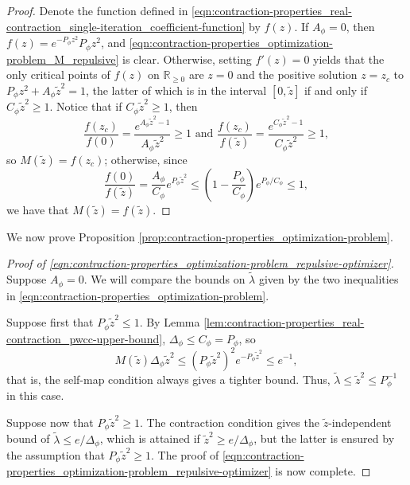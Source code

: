 \documentclass[11pt]{article}
\newcommand{\R}{\mathbb R}
\newcommand{\pwcc}{\Delta_{\phi}}
\newcommand{\tl}{\tilde{\lambda}}
\newcommand{\tz}{\tilde{z}}
\newcommand{\aconst}{A_{\phi}}
\newcommand{\pconst}{P_{\phi}}
\numberwithin{equation}{section}
\theoremstyle{plain}
\theoremstyle{definition}
\theoremstyle{remark}
\begin{document}
\begin{proof}
Denote the function defined in \eqref{eqn:contraction-properties_real-contraction_single-iteration_coefficient-function} by $f(z)$.
If $\aconst=0$, then $f(z)=e^{-\pconst z^{2}}\pconst z^{2}$, and \eqref{eqn:contraction-properties_optimization-problem_M_repulsive} is clear.
Otherwise, setting $f'(z)=0$ yields that the only critical points of $f(z)$ on $\R_{\ge 0}$ are $z=0$ and the positive solution $z=z_{c}$ to $\pconst z^{2}+\aconst\tilde{z}^{2}=1$, the latter of which is in the interval $[0,\tilde{z}]$ if and only if $C_{\phi}\tilde{z}^{2}\ge 1$.
Notice that if $C_{\phi}\tilde{z}^{2}\ge 1$, then
\begin{equation}
\frac{f(z_{c})}{f(0)}=\frac{e^{\aconst\tz^{2}-1}}{\aconst\tz^{2}}\ge 1
\text{ and }
\frac{f(z_{c})}{f(\tz)}=\frac{e^{C_{\phi}\tz^{2}-1}}{C_{\phi}\tz^{2}}\ge 1,
\end{equation}
so $M(\tilde{z})=f(z_{c})$; otherwise, since
\begin{equation}
\frac{f(0)}{f(\tz)}=\frac{\aconst}{C_{\phi}}e^{\pconst\tz^{2}}\le\left(1-\frac{\pconst}{C_{\phi}}\right)e^{\pconst/C_{\phi}}\le 1,
\end{equation}
we have that $M(\tilde{z})=f(\tilde{z})$.
\end{proof}

We now prove Proposition \ref{prop:contraction-properties_optimization-problem}.

\begin{proof}[Proof of \eqref{eqn:contraction-properties_optimization-problem_repulsive-optimizer}]
Suppose $\aconst=0$.
We will compare the bounds on $\tilde{\lambda}$ given by the two inequalities in \eqref{eqn:contraction-properties_optimization-problem}.

Suppose first that $\pconst\tz^{2}\le 1$.
By Lemma \ref{lem:contraction-properties_real-contraction_pwcc-upper-bound}, $\pwcc\le C_{\phi}=\pconst$, so
\begin{equation}
M(\tz)\pwcc\tz^{2}
\le(\pconst\tz^{2})^{2}e^{-\pconst\tz^{2}}\le e^{-1},
\end{equation}
that is, the self-map condition always gives a tighter bound.
Thus, $\tilde{\lambda}\le\tz^{2}\le\pconst^{-1}$ in this case.

Suppose now that $\pconst\tz^{2}\ge 1$.
The contraction condition gives the $\tz$-independent bound of $\tl\le e/\pwcc$, which is attained if $\tz^{2}\ge e/\pwcc$, but the latter is ensured by the assumption that $\pconst\tz^{2}\ge 1$.
The proof of \eqref{eqn:contraction-properties_optimization-problem_repulsive-optimizer} is now complete.
\end{proof}
\end{document}
